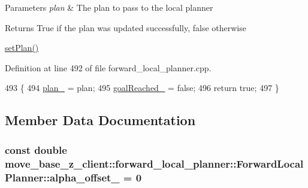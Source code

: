 \begin{DoxyParams}{Parameters}
{\em plan} & The plan to pass to the local planner \\
\hline
\end{DoxyParams}
\begin{DoxyReturn}{Returns}
True if the plan was updated successfully, false otherwise
\end{DoxyReturn}
\hyperlink{classmove__base__z__client_1_1forward__local__planner_1_1ForwardLocalPlanner_a525b842cadd1e69e944907e1945a61c8}{set\+Plan()} 

Definition at line 492 of file forward\+\_\+local\+\_\+planner.\+cpp.


\begin{DoxyCode}
493 \{
494     \hyperlink{classmove__base__z__client_1_1forward__local__planner_1_1ForwardLocalPlanner_a1c6191c999481e31fabd41f7a04041fe}{plan\_} = plan;
495     \hyperlink{classmove__base__z__client_1_1forward__local__planner_1_1ForwardLocalPlanner_a2c86f8381cc3b8677f95f32ae6939023}{goalReached\_} = \textcolor{keyword}{false};
496     \textcolor{keywordflow}{return} \textcolor{keyword}{true};
497 \}
\end{DoxyCode}


\subsection{Member Data Documentation}
\subsubsection[{\texorpdfstring{alpha\+\_\+offset\+\_\+}{alpha_offset_}}]{\setlength{\rightskip}{0pt plus 5cm}const double move\+\_\+base\+\_\+z\+\_\+client\+::forward\+\_\+local\+\_\+planner\+::\+Forward\+Local\+Planner\+::alpha\+\_\+offset\+\_\+ = 0\hspace{0.3cm}{\ttfamily [private]}}\hypertarget{classmove__base__z__client_1_1forward__local__planner_1_1ForwardLocalPlanner_a358adfdd02866b413518dee9d5212b8f}{}\label{classmove__base__z__client_1_1forward__local__planner_1_1ForwardLocalPlanner_a358adfdd02866b413518dee9d5212b8f}


